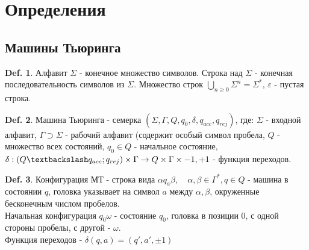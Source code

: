 \documentclass[12pt]{article}
\begin{document}
\renewcommand{\proofname}{Доказательство}

\theoremstyle{plain}
\newtheorem{thm}{Теорема}[section]
\newtheorem*{thesis}{Thesis}[section]
\newtheorem*{lm}{Лемма}
\newtheorem*{st}{Утверждение}
\newtheorem*{prop}{Свойства}

\theoremstyle{definition}
\newtheorem{defn}{Def.}
\newtheorem*{ex}{Пример}
\newtheorem*{exs}{Примеры}
\newtheorem*{cor}{Следствие}
\newtheorem*{name}{Обозначение}

\theoremstyle{remark}
\newtheorem*{rem}{Ремарка}
\newtheorem*{note}{Замечание}
\newtheorem*{probl}{Упражнение}

\newcommand{\Z}{\mathbb{Z}}
\newcommand{\N}{\mathbb{N}}
\newcommand{\R}{\mathbb{R}}
\newcommand{\Q}{\mathbb{Q}}
\newcommand{\K}{\mathbb{K}}
\newcommand{\Cm}{\mathbb{C}}
\newcommand{\Pm}{\mathbb{P}}

\section{Определения}
\subsection{Машины Тьюринга}

\begin{defn}
    Алфавит $\Sigma$ - конечное множество символов. Строка над $\Sigma$ - конечная последовательность символов из $\Sigma$. Множество строк $\bigcup_{n \ge 0} \Sigma ^n = \Sigma ^ *$,  $\varepsilon $ - пустая строка.
\end{defn}
\begin{defn}
    Машина Тьюринга - семерка $(\Sigma, \Gamma, Q, q_0, \delta, q_{acc}, q_{rej})$, где:
    $ \Sigma$ - входной алфавит, $\Gamma \supset \Sigma$ - рабочий алфавит (содержит особый символ пробела, $Q$ - множество всех состояний, $q_0 \in Q$ - начальное состояние, $\delta: (Q \textbackslash  q_{acc} ; q_{rej}) \times \Gamma \to Q \times \Gamma \times {-1, +1}$ - функция переходов.
\end{defn}
\begin{defn}
    Конфигурация МТ - строка вида $\alpha q_a \beta, \quad \alpha, \beta \in \Gamma^*, q \in Q$ - машина в состоянии $q$, головка указывает на символ $a$ между $\alpha, \beta$, окруженные бесконечным числом пробелов. \\
    Начальная конфигурация $q_0 \omega$ - состояние  $q_0$, головка в позиции 0, с одной стороны пробелы, с другой - $\omega$.\\
    Функция переходов - $\delta(q, a) = (q', a', \pm 1)$
\end{defn}
\end{document}
